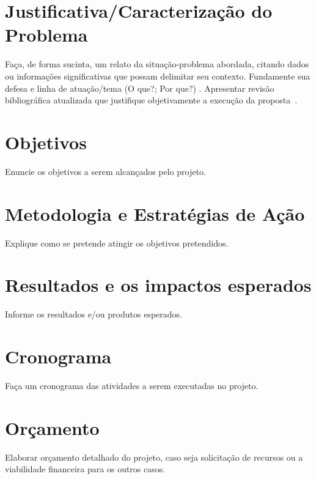 \documentclass[a4paper,11pt]{article}
\begin{document}
\section{Justificativa/Caracterização do Problema}

Faça, de forma sucinta, um relato da situação-problema abordada, citando dados ou informações significativas que possam delimitar seu contexto. Fundamente sua defesa e linha de atuação/tema (O que?; Por que?) . Apresentar revisão bibliográfica atualizada que justifique objetivamente a execução da proposta~\cite{identifier}.


\section{Objetivos}
Enuncie os objetivos a serem alcançados pelo projeto.


\section{Metodologia e Estratégias de Ação}
Explique como se pretende atingir os objetivos pretendidos. 


\section{Resultados e os impactos esperados}
Informe os resultados e/ou produtos esperados. 

\section{Cronograma}
Faça um cronograma das atividades a serem executadas no projeto. 

\section{Orçamento}

Elaborar orçamento detalhado do projeto, caso seja solicitação de recursos ou a viabilidade financeira para os outros casos.



\end{document}
